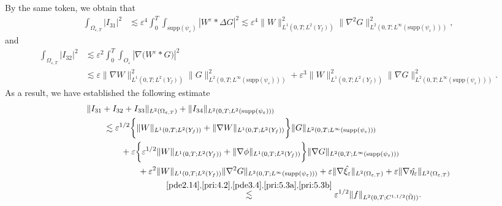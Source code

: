 \documentclass[13pt,CJK]{article}
\theoremstyle{plain}                       %
\theoremstyle{remark}
\numberwithin{equation}{section}
\begin{document}
By the same token, we obtain that
\begin{equation*}
\begin{aligned}
\int_{\Omega_{\varepsilon,T}}
|I_{31}|^2&
\lesssim\varepsilon^4
\int_{0}^{T}\int_{\text{supp}(\psi_{\varepsilon})}
|W^{\varepsilon}\ast\Delta G|^2
\lesssim\varepsilon^4\|W\|^2_{L^1(0,T;L^2(Y_f))}
\|\nabla^2 G\|^2_{L^2(0,T;L^{\infty}
(\text{supp}(\psi_{\varepsilon})))},
\end{aligned}
\end{equation*}
and
\begin{equation*}
\begin{aligned}
\int_{\Omega_{\varepsilon,T}}|I_{32}|^2
&
\lesssim\varepsilon^2\int_{0}^{T}\int_{O_{\varepsilon}}
|\nabla\big(W^{\varepsilon}\ast G\big)|^2 \\
&\lesssim\varepsilon
\|\nabla W\|^2_{L^1(0,T;L^2(Y_f))}
\|G\|^2_{L^2(0,T;L^{\infty}
(\text{supp}(\psi_{\varepsilon})))}
+\varepsilon^3\|W\|^2_{L^1(0,T;L^2(Y_f))}
\|\nabla G\|^2_{L^2(0,T;L^{\infty}
(\text{supp}(\psi_{\varepsilon})))}.
\end{aligned}
\end{equation*}
As a result, we have established the following estimate
\begin{equation}\label{pde5.5}
\begin{aligned}
&\|I_{31}+I_{32}+I_{33}\|_{L^2(\Omega_{\varepsilon,T})}
+\|I_{34}\|_{L^2(0,T;L^2(\text{supp}
(\psi_{\varepsilon})))}\\
&\qquad\lesssim
\varepsilon^{1/2}
\bigg\{\|W\|_{L^1(0,T;L^2(Y_f))}
+\|\nabla W\|_{L^1(0,T;L^2(Y_f))}
\bigg\}
\|G\|_{L^2(0,T;L^{\infty}
(\text{supp}(\psi_{\varepsilon})))}\\
&\qquad\quad\quad+\varepsilon\bigg\{
\varepsilon^{1/2}\|W\|_{L^1(0,T;L^2(Y_f))}
+\|\nabla\phi\|_{L^1(0,T;L^2(Y_f))}\bigg\}
\|\nabla G\|_{L^2(0,T;L^{\infty}
(\text{supp}(\psi_{\varepsilon})))}\\
&\qquad\qquad\quad\quad+\varepsilon^2\|W\|_{L^1(0,T;L^2(Y_f))}
\|\nabla^2 G\|_{L^2(0,T;
L^{\infty}(\text{supp}(\psi_{\varepsilon})))}
+\varepsilon\|\nabla\hat{\xi_{\varepsilon}}\|_{
L^2(\Omega_{\varepsilon,T})}
+\varepsilon\|\nabla\hat{\eta_{\varepsilon}}\|_{
L^2(\Omega_{\varepsilon,T})}\\
&\qquad\qquad\qquad\qquad\quad
\overset{\eqref{pde2.14},\eqref{pri:4.2},\eqref{pde3.4},
\eqref{pri:5.3a},\eqref{pri:5.3b}}{\lesssim}
\varepsilon^{1/2}\|f\|_{L^2(0,T;C^{1,1/2}(\bar{\Omega}))}.
\end{aligned}
\end{equation}
\end{document}
